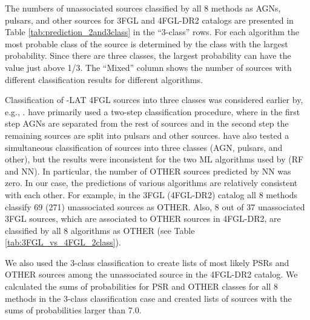 The numbers of unassociated sources classified by all 8 methods as AGNs, pulsars, and other sources for 3FGL and 4FGL-DR2 catalogs are presented in Table \ref{tab:prediction_2and3class} in the ``3-class'' rows.
For each algorithm the most probable class of the source is determined by the class with the largest probability.
Since there are three classes, the largest probability can have the value just above 1/3.
The ``Mixed'' column shows the number of sources with different classification results for different algorithms.


Classification of \Fermi-LAT 4FGL sources into three classes was considered earlier by, e.g., \cite{2021RAA....21...15Z}.
\cite{2021RAA....21...15Z} have primarily used a two-step classification procedure, where in the first step AGNs are separated from the rest of sources and in the second step the remaining sources are split into pulsars and other sources.
\cite{2021RAA....21...15Z} have also tested a simultaneous classification of sources into three classes (AGN, pulsars, and other),
but the results were inconsistent for the two ML algorithms used by \cite{2021RAA....21...15Z} (RF and NN).
In particular, the number of OTHER sources predicted by NN was zero.
In our case, the predictions of various algorithms are relatively consistent with each other.
For example, in the 3FGL (4FGL-DR2) catalog all 8 methods classify 69 (271) unassociated sources as OTHER.
Also, 8 out of 37 unassociated 3FGL sources, which are associated to OTHER sources in 4FGL-DR2, are classified by all 8 algorithms as
OTHER (see Table \ref{tab:3FGL_vs_4FGL_2class}).

We also used the 3-class classification to create lists of most likely PSRs and OTHER sources among the unassociated
source in the 4FGL-DR2 catalog.
We calculated the sums of probabilities for PSR and OTHER classes for all 8 methods in the 3-class classification case
and created lists of sources with the sums of probabilities larger than 7.0.

